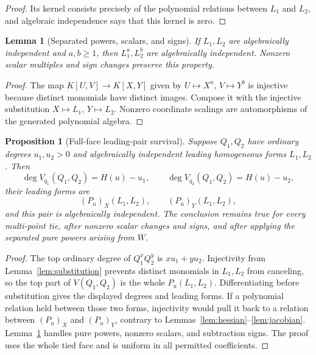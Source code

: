 \documentclass[11pt]{article}
\newtheorem{proposition}[theorem]{Proposition}
\newtheorem{lemma}[theorem]{Lemma}
\theoremstyle{definition}
\theoremstyle{remark}
\begin{document}
\begin{proof}
Its kernel consists precisely of the polynomial relations between
\(L_1\) and \(L_2\), and algebraic independence says that this kernel is
zero.
\end{proof}

\begin{lemma}[Separated powers, scalars, and signs]\label{lem:powers}
If \(L_1,L_2\) are algebraically independent and \(a,b\geq1\), then
\(L_1^a,L_2^b\) are algebraically independent.  Nonzero scalar multiples
and sign changes preserve this property.
\end{lemma}

\begin{proof}
The map \(K[U,V]\to K[X,Y]\) given by
\(U\mapsto X^a\), \(V\mapsto Y^b\) is injective because distinct
monomials have distinct images.  Compose it with the injective
substitution \(X\mapsto L_1\), \(Y\mapsto L_2\).  Nonzero coordinate
scalings are automorphisms of the generated polynomial algebra.
\end{proof}

\begin{proposition}[Full-face leading-pair survival]\label{prop:survival}
Suppose \(Q_1,Q_2\) have ordinary degrees \(u_1,u_2>0\) and algebraically
independent leading homogeneous forms \(L_1,L_2\).  Then
\[
\deg V_{q_1}(Q_1,Q_2)=H(u)-u_1,\qquad
\deg V_{q_2}(Q_1,Q_2)=H(u)-u_2,
\]
their leading forms are
\[
(P_u)_X(L_1,L_2),\qquad (P_u)_Y(L_1,L_2),
\]
and this pair is algebraically independent.  The conclusion remains true
for every multi-point tie, after nonzero scalar changes and signs, and
after applying the separated pure powers arising from \(W\).
\end{proposition}

\begin{proof}
The top ordinary degree of \(Q_1^xQ_2^y\) is \(xu_1+yu_2\).
Injectivity from Lemma~\ref{lem:substitution} prevents distinct monomials
in \(L_1,L_2\) from canceling, so the top part of \(V(Q_1,Q_2)\) is the
whole \(P_u(L_1,L_2)\).  Differentiating before substitution gives the
displayed degrees and leading forms.  If a polynomial relation held
between those two forms, injectivity would pull it back to a relation
between \((P_u)_X\) and \((P_u)_Y\), contrary to
Lemmas~\ref{lem:hessian}--\ref{lem:jacobian}.  Lemma~\ref{lem:powers}
handles pure powers, nonzero scalars, and subtraction signs.  The proof
uses the whole tied face and is uniform in all permitted coefficients.
\end{proof}
\end{document}
